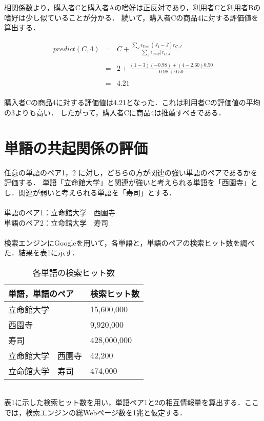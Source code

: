 \documentclass[dvipdfmx,autodetect-engine,titlepage]{jsarticle}
\begin{document}
相関係数より，購入者Cと購入者Aの嗜好は正反対であり，利用者Cと利用者Bの嗜好は少し似ていることが分かる．
続いて，購入者Cの商品4に対する評価値を算出する．

\begin{eqnarray*}
  predict(C,4) &=& \overline{C} + \frac{\sum_{J}\epsilon_{User}(J_{4}-\overline{J})r_{C,J}}{\sum_{J}\epsilon_{User}| r_{C,J}\vert } \\\\
  &=& 2 + \frac{(1-3)(-0.98)+(4-2.60 )0.50}{0.98 + 0.50} \\\\
  &=& 4.21 \\
\end{eqnarray*}

購入者Cの商品4に対する評価値は4.21となった．これは利用者Cの評価値の平均の3よりも高い．
したがって，購入者Cに商品4は推薦すべきである．



\section{単語の共起関係の評価}
任意の単語のペア1，2 に対し，どちらの方が関連の強い単語のペアであるかを評価する．
単語「立命館大学」と関連が強いと考えられる単語を「西園寺」とし．関連が弱いと考えられる単語を「寿司」とする．\\\\
単語のペア1：立命館大学　西園寺 \\
単語のペア2：立命館大学　寿司 \\\\
検索エンジンにGoogleを用いて，各単語と，単語のペアの検索ヒット数を調べた．結果を表1に示す．

\begin{table}[H]
  \centering
  \caption{各単語の検索ヒット数}
  \label{table: Artifact}
  \begin{tabular}{|l|l|}
  \hline
  単語，単語のペア  & 検索ヒット数      \\ \hline
  立命館大学     & 15,600,000  \\ \hline
  西園寺       & 9,920,000   \\ \hline
  寿司        & 428,000,000 \\ \hline
  立命館大学　西園寺 & 42,200      \\ \hline
  立命館大学　寿司  & 474,000     \\ \hline
  \end{tabular}
  \end{table}
　\\
表1に示した検索ヒット数を用い，単語ペア1と2の相互情報量を算出する．ここでは，検索エンジンの総Webページ数を1兆と仮定する．
\end{document}
